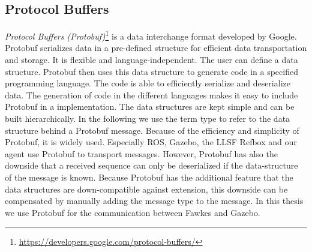 \subsection{Protocol Buffers}
\textit{Protocol Buffers (Protobuf)}\footnote{\url{https://developers.google.com/protocol-buffers/}} is a data interchange format developed by Google. Protobuf serializes data in a pre-defined structure for efficient data transportation and storage. It is flexible and language-independent. The user can define a data structure. Protobuf then uses this data structure to generate code in a specified programming language. The code is able to efficiently serialize and deserialize data. The generation of code in the different languages makes it easy to include Protobuf in a implementation. The data structures are kept simple and can be built hierarchically. In the following we use the term type to refer to the data structure behind a Protobuf message. Because of the efficiency and simplicity of Protobuf, it is widely used. Especially ROS, Gazebo, the LLSF Refbox and our agent use Protobuf to transport messages. However, Protobuf has also the downside that a received sequence can only be deserialized if the data-structure of the message is known. Because Protobuf has the additional feature that the data structures are down-compatible against extension, this downside can be compensated by manually adding the message type to the message. In this thesis we use Protobuf for the communication between Fawkes and Gazebo.

